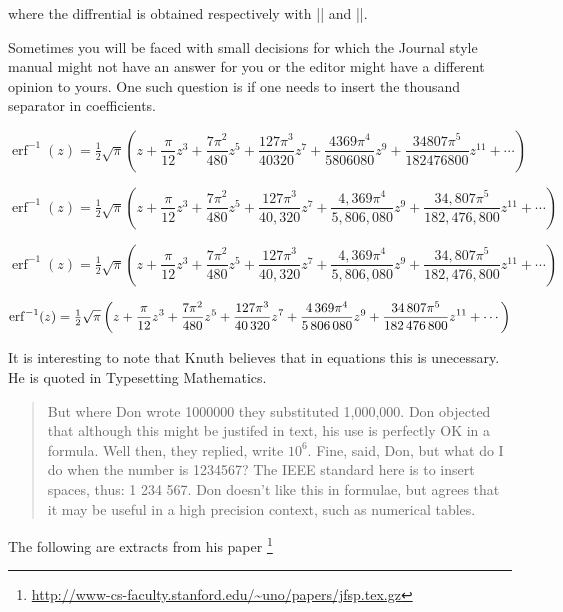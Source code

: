{where the diffrential is obtained respectively with
|| and |\ud|.





Sometimes you will be faced with small decisions for which the Journal style manual might not have an answer for you or the editor might have a different opinion to yours. One such question is if one needs to insert the thousand separator in coefficients.

\[
\operatorname{erf}^{-1}(z)=\tfrac{1}{2}\sqrt{\pi}\left (z+\frac{\pi}{12}z^3+\frac{7\pi^2}{480}z^5+\frac{127\pi^3}{40320}z^7+\frac{4369\pi^4}{5806080}z^9+\frac{34807\pi^5}{182476800}z^{11}+\cdots\right )
\]


\[
\operatorname{erf}^{-1}(z)=\tfrac{1}{2}\sqrt{\pi}\left (z+\frac{\pi}{12}z^3+\frac{7\pi^2}{480}z^5+\frac{127\pi^3}{40,320}z^7+\frac{4,369\pi^4}{5,806,080}z^9+\frac{34,807\pi^5}{182,476,800}z^{11}+\cdots\right )
\]

\[
\operatorname{erf}^{-1}(z)=\tfrac{1}{2}\sqrt{\pi}\left (z+\frac{\pi}{12}z^3+\frac{7\pi^2}{480}z^5+\frac{127\pi^3}{40{,}320}z^7+\frac{4{,}369\pi^4}{5{,}806{,}080}z^9+\frac{34{,}807\pi^5}{182{,}476,800}z^{11}+\cdots\right )
\]



\[
\operatorname{erf}^{-1}(z)=\tfrac{1}{2}\sqrt{\pi}\left (z+\frac{\pi}{12}z^3+\frac{7\pi^2}{480}z^5+\frac{127\pi^3}{40\thinspace 320}z^7+\frac{4\thinspace 369\pi^4}{5\thinspace 806\thinspace 080}z^9+\frac{34\thinspace 807\pi^5}{182\thinspace 476\thinspace 800}z^{11}+\cdots\right )
\]


It is interesting to note that Knuth believes that in equations this is unecessary.
He is quoted in Typesetting Mathematics.

\begin{quotation}
But where Don wrote 1000000 they substituted
1,000,000. Don objected that although this might be justifed in text, his use is perfectly OK in a formula. Well then, they replied, write \(10^6\).
Fine, said, Don, but what do I do 
when the number is 1234567? The IEEE standard here is to insert spaces, thus: 1 234 567.
Don doesn't like this in formulae, but agrees that it may be useful in a high precision context, such as numerical tables. 
\end{quotation}



The following are extracts from his paper \footnote{\url{http://www-cs-faculty.stanford.edu/~uno/papers/jfsp.tex.gz}}

}
